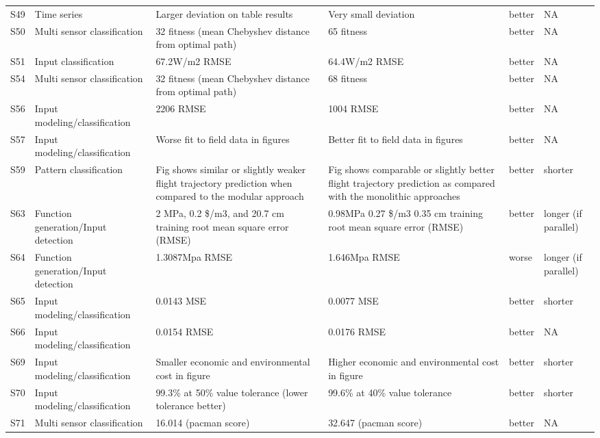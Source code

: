 \documentclass{article}
\begin{document}
\begin{table*}[]
\begin{tabularx}{\textwidth}{p{.2cm} p{4.75cm}  X X p{1.5cm} p{1.5cm} }
S49 	&	 Time series 			&	 Larger deviation on table results 	&	 Very small deviation 	&	better	&	 NA 	\\
S50 	&	 Multi sensor classification 			&	 32 fitness (mean Chebyshev distance from optimal path) 	&	 65 fitness 	&	better	&	 NA 	\\
S51 	&	 Input classification 			&	 67.2W/m2 RMSE 	&	 64.4W/m2 RMSE 	&	better	&	 NA 	\\
S54 	&	 Multi sensor classification 			&	 32 fitness (mean Chebyshev distance from optimal path) 	&	 68 fitness 	&	better	&	 NA 	\\
S56 	&	 Input modeling/classification 			&	 2206 RMSE 	&	 1004 RMSE 	&	better	&	 NA 	\\
S57 	&	 Input modeling/classification 			&	 Worse fit to field data in figures 	&	 Better fit to field data in figures 	&	better	&	 NA 	\\
S59 	&	 Pattern classification 			&	 Fig shows similar or slightly weaker flight trajectory prediction when compared to the modular approach 	&	 Fig shows comparable or slightly better flight trajectory prediction as compared with the monolithic approaches 	&	better	&	 shorter 	\\
S63 	&	 Function generation/Input detection 			&	 2 MPa, 0.2 \$/m3, and 20.7 cm training root mean square error (RMSE) 	&	 0.98MPa 0.27 \$/m3 0.35 cm training root mean square error (RMSE) 	&	better	&	 longer \newline (if parallel) 	\\
S64 	&	 Function generation/Input detection 			&	 1.3087Mpa RMSE 	&	 1.646Mpa RMSE 	&	worse	&	 longer \newline (if  parallel) 	\\
S65 	&	 Input modeling/classification 			&	 0.0143 MSE 	&	 0.0077 MSE 	&	better	&	 shorter 	\\
S66 	&	 Input modeling/classification 			&	 0.0154 RMSE 	&	 0.0176 RMSE 	&	better	&	 NA 	\\
S69 	&	 Input modeling/classification 			&	 Smaller economic and environmental cost in figure 	&	 Higher economic and environmental cost in figure 	&	better	&	 shorter 	\\
S70 	&	 Input modeling/classification 			&	 99.3\% at 50\% value tolerance (lower tolerance better) 	&	 99.6\% at 40\% value tolerance 	&	better	&	 shorter 	\\
S71 	&	 Multi sensor classification 			&	 16.014 (pacman score) 	&	 32.647 (pacman score) 	&	better	&	 NA 	\\

\end{tabularx}
\end{table*}
\end{document}
